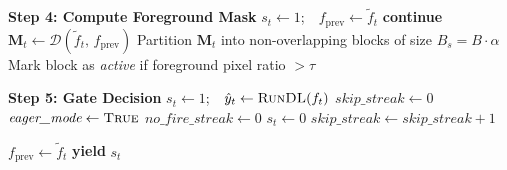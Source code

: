 \begin{algorithm}[ht]
\begin{algorithmic}[1]
    \Statex \hspace{1.5em} \textbf{Step 4: Compute Foreground Mask}
        \State $s_t \leftarrow 1$;\ \ $f_{\text{prev}} \leftarrow \tilde{f}_t$
        \State \textbf{continue}
    \EndIf
    \State $\mathbf{M}_t \leftarrow \mathcal{D}(\tilde{f}_t,\, f_{\text{prev}})$
    \State Partition $\mathbf{M}_t$ into non-overlapping blocks of size $B_s = B \cdot \alpha$
    \State Mark block as \textit{active} if foreground pixel ratio $> \tau$

    \Statex \hspace{1.5em} \textbf{Step 5: Gate Decision}
        \State $s_t \leftarrow 1$;\ \ $\hat{y}_t \leftarrow \textsc{RunDL}(f_t)$
        \State $\textit{skip\_streak} \leftarrow 0$
            \State $\textit{eager\_mode} \leftarrow \textsc{True}$  
            \State $\textit{no\_fire\_streak} \leftarrow 0$
        \EndIf
    \Else
        \State $s_t \leftarrow 0$  
        \State $\textit{skip\_streak} \leftarrow \textit{skip\_streak} + 1$
    \EndIf

    \State $f_{\text{prev}} \leftarrow \tilde{f}_t$
    \State \textbf{yield} $s_t$

\EndFor

\end{algorithmic}
\end{algorithm}